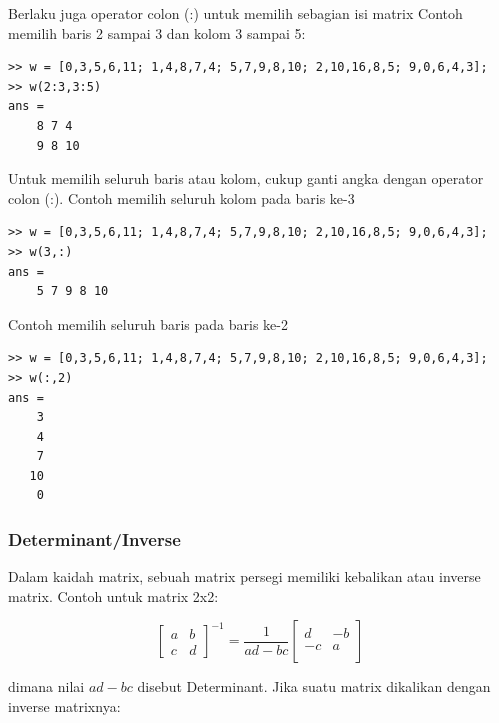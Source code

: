 \documentclass[12pt]{book}
\begin{document}
	Berlaku juga operator colon (:) untuk memilih sebagian isi matrix
	Contoh memilih baris 2 sampai 3 dan kolom 3 sampai 5:
	\begin{verbatim}
>> w = [0,3,5,6,11; 1,4,8,7,4; 5,7,9,8,10; 2,10,16,8,5; 9,0,6,4,3];
>> w(2:3,3:5)
ans =
    8 7 4
    9 8 10
	\end{verbatim}

	Untuk memilih seluruh baris atau kolom, cukup ganti angka dengan operator colon (:).
	Contoh memilih seluruh kolom pada baris ke-3
	\begin{verbatim}
>> w = [0,3,5,6,11; 1,4,8,7,4; 5,7,9,8,10; 2,10,16,8,5; 9,0,6,4,3];
>> w(3,:)
ans =
    5 7 9 8 10
	\end{verbatim}

	Contoh memilih seluruh baris pada baris ke-2
	\begin{verbatim}
>> w = [0,3,5,6,11; 1,4,8,7,4; 5,7,9,8,10; 2,10,16,8,5; 9,0,6,4,3];
>> w(:,2)
ans =
    3
    4
    7
   10
    0
	\end{verbatim}

	\subsubsection{Determinant/Inverse}

	Dalam kaidah matrix, sebuah matrix persegi memiliki kebalikan atau inverse matrix.
	Contoh untuk matrix 2x2:

	\[
	\begin{bmatrix}
		a & b\\
		c & d
	\end{bmatrix}^{-1}
	=
	\frac{1}{ad-bc}
	\begin{bmatrix}
		d & -b \\
		-c & a\\
	\end{bmatrix}
	\]

	dimana nilai $ad-bc$ disebut Determinant.
	Jika suatu matrix dikalikan dengan inverse matrixnya:
\end{document}
